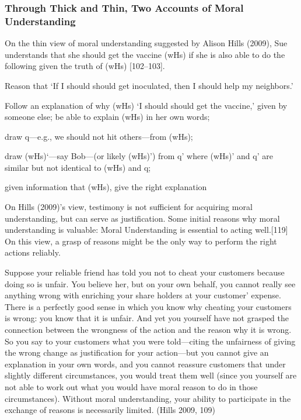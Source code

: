 \documentclass[
  letterpaper,
  DIV=11,
  numbers=noendperiod]{scrartcl}
\theoremstyle{remark}
\begin{document}
\subsubsection{Through Thick and Thin, Two Accounts of Moral
Understanding}\label{through-thick-and-thin-two-accounts-of-moral-understanding}

On the thin view of moral understanding suggested by Alison Hills
(2009), Sue understands that she should get the vaccine (wHs) if she is
also able to do the following given the truth of (wHs) {[}102--103{]}.

Reason that `If I should should get inoculated, then I should help my
neighbors.'

Follow an explanation of why (wHs) `I should should get the vaccine,'
given by someone else; be able to explain (wHs) in her own words;

draw q---e.g., we should not hit others---from (wHs);

draw (wHs)`---say Bob---(or likely (wHs)') from q' where (wHs)' and q'
are similar but not identical to (wHs) and q;

given information that (wHs), give the right explanation

On Hills (2009)'s view, testimony is not sufficient for acquiring moral
understanding, but can serve as justification. Some initial reasons why
moral understanding is valuable: Moral Understanding is essential to
acting well.{[}119{]} On this view, a grasp of reasons might be the only
way to perform the right actions reliably.

Suppose your reliable friend has told you not to cheat your customers
because doing so is unfair. You believe her, but on your own behalf, you
cannot really see anything wrong with enriching your share holders at
your customer' expense. There is a perfectly good sense in which you
know why cheating your customers is wrong: you know that it is unfair.
And yet you yourself have not grasped the connection between the
wrongness of the action and the reason why it is wrong. So you say to
your customers what you were told---citing the unfairness of giving the
wrong change as justification for your action---but you cannot give an
explanation in your own words, and you cannot reassure customers that
under slightly different circumstances, you would treat them well (since
you yourself are not able to work out what you would have moral reason
to do in those circumstances). Without moral understanding, your ability
to participate in the exchange of reasons is necessarily limited. (Hills
2009, 109)
\end{document}

